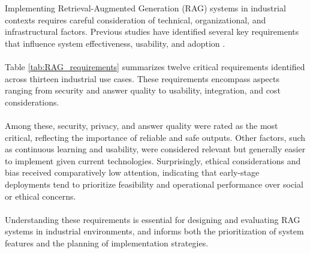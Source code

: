 Implementing Retrieval-Augmented Generation (RAG) systems in industrial contexts requires careful consideration of technical, organizational, and infrastructural factors. Previous studies have identified several key requirements that influence system effectiveness, usability, and adoption \cite{Brehme}.
\\\\
Table \ref{tab:RAG_requirements} summarizes twelve critical requirements identified across thirteen industrial use cases. These requirements encompass aspects ranging from security and answer quality to usability, integration, and cost considerations.
\\\\
Among these, security, privacy, and answer quality were rated as the most critical, reflecting the importance of reliable and safe outputs. Other factors, such as continuous learning and usability, were considered relevant but generally easier to implement given current technologies. Surprisingly, ethical considerations and bias received comparatively low attention, indicating that early-stage deployments tend to prioritize feasibility and operational performance over social or ethical concerns.
\\\\
Understanding these requirements is essential for designing and evaluating RAG systems in industrial environments, and informs both the prioritization of system features and the planning of implementation strategies.

